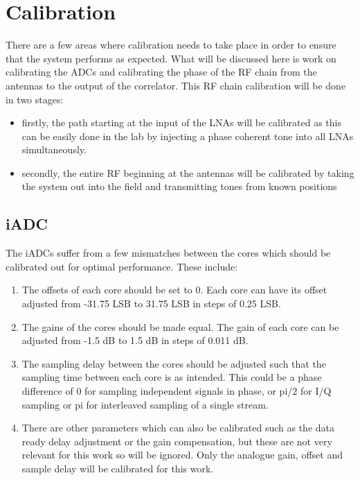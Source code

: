 \chapter{Calibration}

There are a few areas where calibration needs to take place in order to ensure that the system performs as expected. What will be discussed here is work on calibrating the ADCs and calibrating the phase of the RF chain from the antennas to the output of the correlator. This RF chain calibration will be done in two stages: 
\begin{itemize}
  \item firstly, the path starting at the input of the LNAs will be calibrated as this can be easily done in the lab by injecting a phase coherent tone into all LNAs simultaneously.
  \item secondly, the entire RF beginning at the antennas will be calibrated by taking the system out into the field and transmitting tones from known positions
\end{itemize}

\section{iADC}
The iADCs suffer from a few mismatches between the cores which should be calibrated out for optimal performance. These include:
\begin{enumerate}
  \item The offsets of each core should be set to 0. Each core can have its offset adjusted from -31.75 LSB to 31.75 LSB in steps of 0.25 LSB.
  \item The gains of the cores should be made equal. The gain of each core can be adjusted from -1.5 dB to 1.5 dB in steps of 0.011 dB. 
  \item The sampling delay between the cores should be adjusted such that the sampling time between each core is as intended. This could be a phase difference of 0 for sampling independent signals in phase, or pi/2 for I/Q sampling or pi for interleaved sampling of a single stream.
  \item There are other parameters which can also be calibrated such as the data ready delay adjustment or the gain compensation, but these are not very relevant for this work so will be ignored. Only the analogue gain, offset and sample delay will be calibrated for this work.
\end{enumerate}
